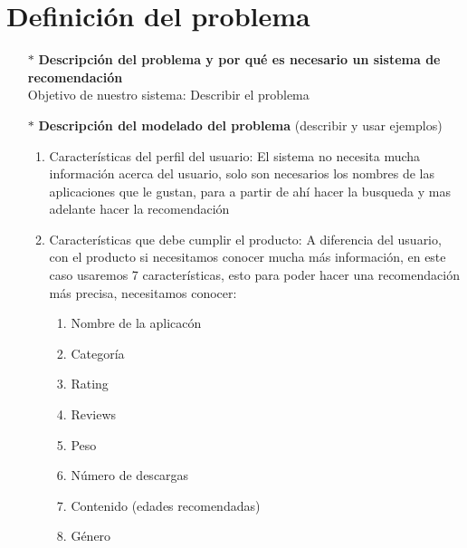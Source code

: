 \documentclass[10pt, a4paper]{article}
\begin{document}
\section{Definici\'on del problema}
\begin{enumerate}
\item[$\ast$]\textbf{Descripción del problema y por qué es necesario un sistema de recomendaci\'on} \\
Objetivo de nuestro sistema: 
Describir el problema
\item[$\ast$]\textbf{Descripción del modelado del problema }(describir y usar ejemplos) \\
\begin{enumerate}
\item Características del perfil del usuario: El sistema no necesita mucha informaci\'on acerca del usuario, solo son necesarios los nombres de las aplicaciones que le gustan, para a partir de ah\'i hacer la busqueda y mas adelante hacer la recomendaci\'on\\
\item Características que debe cumplir el producto: A diferencia del usuario, con el producto si necesitamos conocer mucha m\'as informaci\'on, en este caso usaremos 7 caracter\'isticas, esto para poder hacer una recomendaci\'on m\'as precisa, necesitamos conocer: \\
\begin{enumerate}
\item Nombre de la aplicac\'on  
\item Categor\'ia
\item Rating 
\item Reviews
\item Peso
\item N\'umero de descargas
\item Contenido (edades recomendadas)
\item G\'enero
\end{enumerate}
\end{enumerate} 
\end{enumerate}
\end{document}
